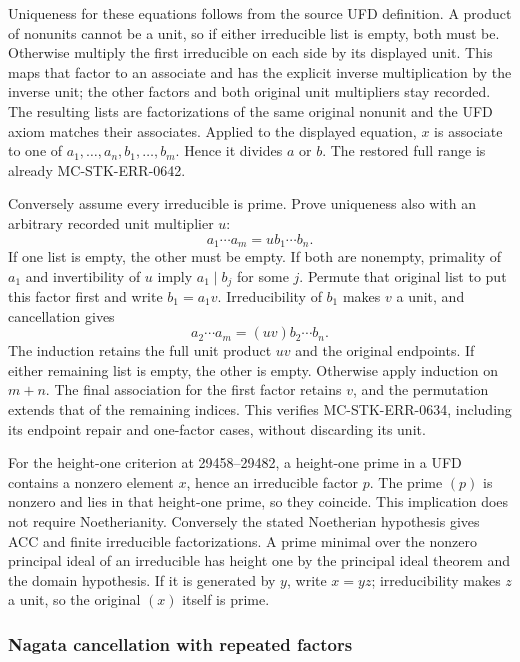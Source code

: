 Uniqueness for these equations follows from the source UFD definition. A product of nonunits cannot be a unit, so if either irreducible list is empty, both must be. Otherwise multiply the first irreducible on each side by its displayed unit. This maps that factor to an associate and has the explicit inverse multiplication by the inverse unit; the other factors and both original unit multipliers stay recorded. The resulting lists are factorizations of the same original nonunit and the UFD axiom matches their associates. Applied to the displayed equation, \(x\) is associate to one of \(a_1,\ldots,a_n,b_1,\ldots,b_m\). Hence it divides \(a\) or \(b\). The restored full range is already MC-\AlgebraIdentifierBreak{}STK-\AlgebraIdentifierBreak{}ERR-\AlgebraIdentifierBreak{}0642.

Conversely assume every irreducible is prime. Prove uniqueness also with an arbitrary recorded unit multiplier \(u\): \[
 a_1\cdots a_m=u b_1\cdots b_n.
\] If one list is empty, the other must be empty. If both are nonempty, primality of \(a_1\) and invertibility of \(u\) imply \(a_1\mid b_j\) for some \(j\). Permute that original list to put this factor first and write \(b_1=a_1v\). Irreducibility of \(b_1\) makes \(v\) a unit, and cancellation gives \[
 a_2\cdots a_m=(uv)b_2\cdots b_n.
\] The induction retains the full unit product \(uv\) and the original endpoints. If either remaining list is empty, the other is empty. Otherwise apply induction on \(m+n\). The final association for the first factor retains \(v\), and the permutation extends that of the remaining indices. This verifies MC-\AlgebraIdentifierBreak{}STK-\AlgebraIdentifierBreak{}ERR-\AlgebraIdentifierBreak{}0634, including its endpoint repair and one-factor cases, without discarding its unit.

For the height-one criterion at 29458--29482, a height-one prime in a UFD contains a nonzero element \(x\), hence an irreducible factor \(p\). The prime \((p)\) is nonzero and lies in that height-one prime, so they coincide. This implication does not require Noetherianity. Conversely the stated Noetherian hypothesis gives ACC and finite irreducible factorizations. A prime minimal over the nonzero principal ideal of an irreducible has height one by the principal ideal theorem and the domain hypothesis. If it is generated by \(y\), write \(x=yz\); irreducibility makes \(z\) a unit, so the original \((x)\) itself is prime.

\subsubsection{Nagata cancellation with repeated factors}\label{algebra-proof-029-nagata-cancellation-with-repeated-factors}

